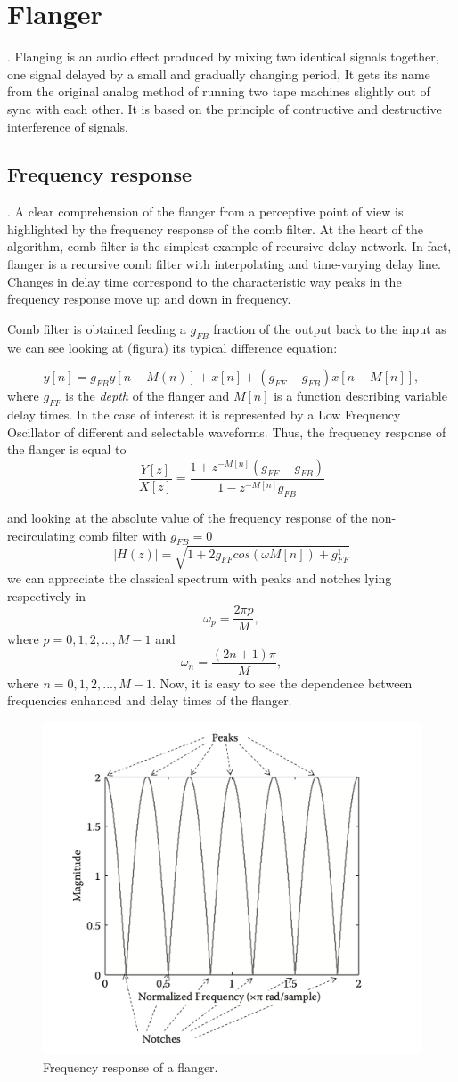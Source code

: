 \section{Flanger}
.
Flanging is an audio effect produced by mixing two identical signals together, one signal delayed by a small and gradually changing period, It gets its name from the original analog method of running two tape machines slightly out of sync with each other. It is based on the principle of contructive and destructive interference of signals.
\subsection{Frequency response}\label{sec:combfilt}
.
A clear comprehension of the flanger from a perceptive point of view  is highlighted by the frequency response of the comb filter. 
At the heart of the algorithm, comb filter is the simplest example of recursive delay network.
In fact, flanger is a recursive comb filter with interpolating and time-varying delay line. Changes in delay time correspond to the characteristic way peaks in the frequency response move up and down in frequency\cite{puckette2006theory}.

Comb filter is obtained feeding a $g_{FB}$ fraction of the output back to the input as we can see looking at (figura) its typical difference equation:

\[
y[n] = g_{FB} y[n - M(n)] + x[n] + (g_{FF} - g_{FB}) x[n - M[n]],
\]
where $g_{FF}$ is the \textit{depth} of the flanger and $M[n]$ is a function describing variable delay times. In the case of interest it is represented by a Low Frequency Oscillator of different and selectable waveforms. Thus, the frequency response of the flanger is equal to 
\[
\frac{Y[z]}{X[z]} = \frac{1 + z^{-M[n]} (g_{FF} - g_{FB})} {1 - z^{-M[n]}  g_{FB} }
\]

and looking at the absolute value of the frequency response of the non-recirculating comb filter with $g_{FB} = 0$ 
\[
|H(z)| = \sqrt{ 1 + 2g_{FF} cos(\omega M[n]) + g_{FF}^1}
\]
we can appreciate the classical spectrum with peaks and notches lying respectively in 
\[
\omega_p = \frac{2 \pi p}{M},
\]
where $p = 0, 1, 2, ..., M-1$ and 
\[
\omega_n = \frac{(2n+1) \pi}{M},
\]
where $n = 0, 1, 2, ..., M-1$. Now, it is easy to see the dependence between frequencies enhanced and delay times of the flanger. 
\begin{figure}
	\centering
	\includegraphics[width=0.5\linewidth]{assets/comb.png}
	\caption{Frequency response of a flanger.}
	\label{fig:comb}
\end{figure}


